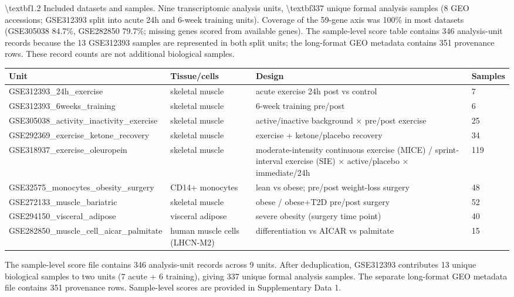 \documentclass[11pt]{article}
\begin{document}
\textbackslash{}textbf{1.2 Included datasets and samples.} Nine transcriptomic analysis units, \textbackslash{}textbf{337 unique formal analysis samples} (8 GEO accessions; GSE312393 split into acute 24h and 6-week training units). Coverage of the 59-gene axis was 100\% in most datasets (GSE305038 84.7\%, GSE282850 79.7\%; missing genes scored from available genes). The sample-level score table contains 346 analysis-unit records because the 13 GSE312393 samples are represented in both split units; the long-format GEO metadata contains 351 provenance rows. These record counts are not additional biological samples.

\begin{table}[h!]
\centering
\begin{tabular}{llll}
\toprule
Unit & Tissue/cells & Design & Samples \\
\midrule
GSE312393\_24h\_exercise & skeletal muscle & acute exercise 24h post vs control & 7 \\
GSE312393\_6weeks\_training & skeletal muscle & 6-week training pre/post & 6 \\
GSE305038\_activity\_inactivity\_exercise & skeletal muscle & active/inactive background × pre/post exercise & 25 \\
GSE292369\_exercise\_ketone\_recovery & skeletal muscle & exercise + ketone/placebo recovery & 34 \\
GSE318937\_exercise\_oleuropein & skeletal muscle & moderate-intensity continuous exercise (MICE) / sprint-interval exercise (SIE) × active/placebo × immediate/24h & 119 \\
GSE32575\_monocytes\_obesity\_surgery & CD14+ monocytes & lean vs obese; pre/post weight-loss surgery & 48 \\
GSE272133\_muscle\_bariatric & skeletal muscle & obese / obese+T2D pre/post surgery & 52 \\
GSE294150\_visceral\_adipose & visceral adipose & severe obesity (surgery time point) & 40 \\
GSE282850\_muscle\_cell\_aicar\_palmitate & human muscle cells (LHCN-M2) & differentiation vs AICAR vs palmitate & 15 \\
\bottomrule
\end{tabular}
\end{table}
\par\vspace{4pt}
The sample-level score file contains 346 analysis-unit records across 9 units. After deduplication, GSE312393 contributes 13 unique biological samples to two units (7 acute + 6 training), giving 337 unique formal analysis samples. The separate long-format GEO metadata file contains 351 provenance rows. Sample-level scores are provided in Supplementary Data 1.
\end{document}
